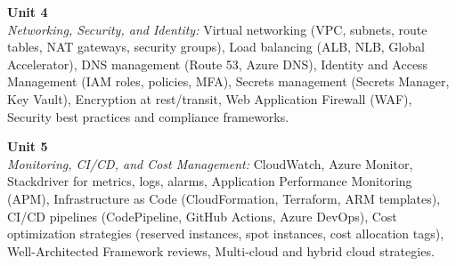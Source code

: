 \noindent\textbf{Unit 4} \\
\textit{Networking, Security, and Identity:} Virtual networking (VPC, subnets, route tables, NAT gateways, security groups), Load balancing (ALB, NLB, Global Accelerator), DNS management (Route 53, Azure DNS), Identity and Access Management (IAM roles, policies, MFA), Secrets management (Secrets Manager, Key Vault), Encryption at rest/transit, Web Application Firewall (WAF), Security best practices and compliance frameworks.

\vspace{0.3cm}

\noindent\textbf{Unit 5} \\
\textit{Monitoring, CI/CD, and Cost Management:} CloudWatch, Azure Monitor, Stackdriver for metrics, logs, alarms, Application Performance Monitoring (APM), Infrastructure as Code (CloudFormation, Terraform, ARM templates), CI/CD pipelines (CodePipeline, GitHub Actions, Azure DevOps), Cost optimization strategies (reserved instances, spot instances, cost allocation tags), Well-Architected Framework reviews, Multi-cloud and hybrid cloud strategies.

\newpage
{}
